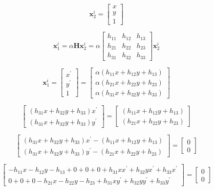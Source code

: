 \documentclass[12pt]{article}
\begin{document}
$$
\textbf{x}^{i}_{2}=
\begin{bmatrix}
x \\ y \\ 1
\end{bmatrix}
$$

$$
\textbf{x}^{i}_{1}=
\alpha
\textbf{H}
\textbf{x}^{i}_{2}
=
\alpha
\begin{bmatrix}
h_{11} & h_{12} & h_{13} \\
h_{21} & h_{22} & h_{23} \\
h_{31} & h_{32} & h_{33} 
\end{bmatrix}
\textbf{x}^{i}_{2}
$$

$$
\textbf{x}^{i}_{1}=
\begin{bmatrix}
x^{ \prime } \\ y ^ { \prime } \\ 1
\end{bmatrix}
=
\begin{bmatrix}
\alpha ( h_{11} x + h_{12} y + h_{13} ) \\
\alpha ( h_{21} x + h_{22} y + h_{23} ) \\
\alpha ( h_{31} x + h_{32} y + h_{33} )
\end{bmatrix}
$$

$$
\begin{bmatrix}
( h_{31} x + h_{32} y + h_{33} ) x^{ \prime } \\ 
( h_{31} x + h_{32} y + h_{33} ) y^ { \prime } 
\end{bmatrix}
=
\begin{bmatrix}
( h_{11} x + h_{12} y + h_{13} ) \\
( h_{21} x + h_{22} y + h_{23} )
\end{bmatrix}
$$

$$
\begin{bmatrix}
( h_{31} x + h_{32} y + h_{33} ) x^{ \prime } - ( h_{11} x + h_{12} y + h_{13} ) \\
( h_{31} x + h_{32} y + h_{33} ) y^{ \prime } - ( h_{21} x + h_{22} y + h_{23} )
\end{bmatrix}
=
\begin{bmatrix}
0 \\ 0
\end{bmatrix}
$$

$$
\begin{bmatrix}
- h_{11} x 
- h_{12} y 
- h_{13}
+ 0 + 0 + 0
+ h_{31} x  x^{ \prime }
+ h_{32} y  x^{ \prime }
+ h_{33} x^{ \prime }   \\
0 + 0 + 0
- h_{21} x 
- h_{22} y 
- h_{23}
+ h_{31} x y^{ \prime } 
+ h_{32} y y^{ \prime } 
+ h_{33}   y^{ \prime } 
\end{bmatrix}
=
\begin{bmatrix}
0 \\ 0
\end{bmatrix}
$$
\end{document}
